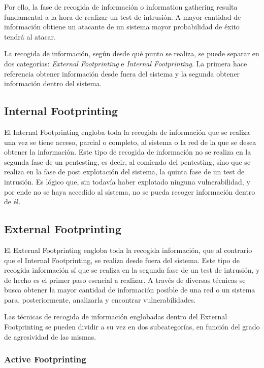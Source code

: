 Por ello, la fase de recogida de información o information gathering resulta fundamental a la hora de realizar un test de intrusión. A mayor cantidad de información obtiene un atacante de un sistema mayor probabilidad de éxito tendrá al atacar.

La recogida de información, según desde qué punto se realiza, se puede separar en dos categorías: \textit{External Footprinting} e \textit{Internal Footprinting}. La primera hace referencia obtener información desde fuera del sistema y la segunda obtener información dentro del sistema.

\subsection{Internal Footprinting}

El Internal Footprinting engloba toda la recogida de información que se realiza una vez se tiene acceso, parcial o completo, al sistema o la red de la que se desea obtener la información. Este tipo de recogida de información no se realiza en la segunda fase de un pentesting, es decir, al comiendo del pentesting, sino que se realiza en la fase de post explotación del sistema, la quinta fase de un test de intrusión. Es lógico que, sin todavía haber explotado ninguna vulnerabilidad, y por ende no se haya accedido al sistema, no se pueda recoger información dentro de él.

\subsection{External Footprinting}

El External Footprinting engloba toda la recogida información, que al contrario que el Internal Footprinting, se realiza desde fuera del sistema. Este tipo de recogida información sí que se realiza en la segunda fase de un test de intrusión, y de hecho es el primer paso esencial a realizar. A través de diversas técnicas se busca obtener la mayor cantidad de información posible de una red o un sistema para, posteriormente, analizarla y encontrar vulnerabilidades.

Las técnicas de recogida de información englobadas dentro del External Footprinting se pueden dividir a su vez en dos subcategorías, en función del grado de agresividad de las mismas. 

\subsubsection{Active Footprinting}

